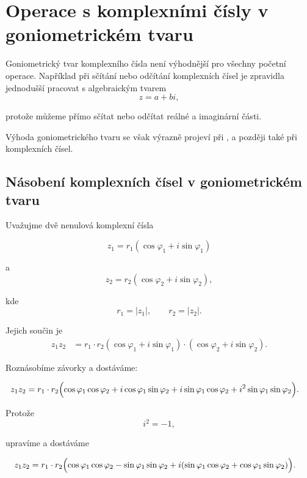 \documentclass[12pt,a4paper]{article}
\begin{document}

\section{Operace s komplexními čísly v goniometrickém tvaru}
Goniometrický tvar komplexního čísla není výhodnější pro všechny početní operace.
Například při sčítání nebo odčítání komplexních čísel je zpravidla jednodušší
pracovat s algebraickým tvarem
\[
    z=a+bi,
\]

protože můžeme přímo sčítat nebo odčítat reálné a imaginární části.

Výhoda goniometrického tvaru se však výrazně projeví při
,  a později také při
 komplexních čísel.



\subsection{Násobení komplexních čísel v goniometrickém tvaru}

Uvažujme dvě nenulová komplexní čísla

\[
    z_1 = r_1 \left(\cos\varphi_1 + i\sin\varphi_1\right)
\]

a
\[
    z_2 = r_2 \left(\cos\varphi_2 + i\sin\varphi_2\right),
\]

kde
\[
    r_1=|z_1|, \qquad r_2=|z_2|.
\]

Jejich součin je
\begin{align*}
    z_1z_2  &= r_1 \cdot r_2 \left(\cos\varphi_1+i\sin\varphi_1\right) \cdot \left(\cos\varphi_2+i\sin\varphi_2\right).
\end{align*}

Roznásobíme závorky a dostáváme:

\begin{align*}
    z_1z_2  &= r_1 \cdot r_2 \Bigl( \cos\varphi_1\cos\varphi_2 + i\cos\varphi_1\sin\varphi_2 + i\sin\varphi_1\cos\varphi_2 + i^2\sin\varphi_1\sin\varphi_2 \Bigr).
\end{align*}

Protože
\[
    i^2=-1,
\]

upravíme a dostáváme

\begin{align*}
    z_1z_2  &= r_1 \cdot r_2 \Bigl( \cos\varphi_1\cos\varphi_2 - \sin\varphi_1\sin\varphi_2 + i(\sin\varphi_1\cos\varphi_2 + \cos\varphi_1\sin\varphi_2)\Bigr).
\end{align*}
\end{document}
